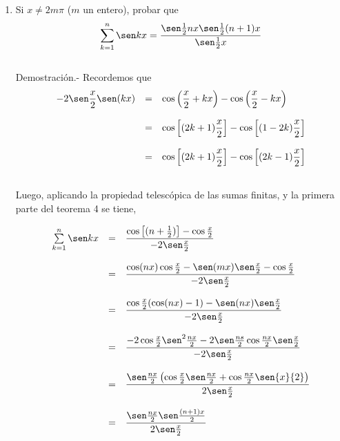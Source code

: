 \begin{enumerate}[\bfseries 1.]
\item Si $x\neq 2m\pi$ ($m$ un entero), probar que 
    $$\sum\limits_{k=1}^n \sen kx = \dfrac{\sen\frac{1}{2} nx \sen\frac{1}{2}(n+1)x}{\sen\frac{1}{2}x}$$\\
    Demostración.-\; Recordemos que 
    $$\begin{array}{rcl}
    -2\sen\dfrac{x}{2}\sen(kx)&=&\cos\left(\dfrac{x}{2}+kx\right) - \cos\left(\dfrac{x}{2}-kx\right)\\\\
			      &=&\cos\left[(2k+1)\dfrac{x}{2}\right]-\cos\left[(1-2k)\dfrac{x}{2}\right]\\\\
			      &=&\cos \left[(2k+1)\dfrac{x}{2}\right]-\cos\left[(2k-1)\dfrac{x}{2}\right]\\\\
    \end{array}$$
    
    Luego, aplicando la propiedad telescópica de las sumas finitas, y la primera parte del teorema 4 se tiene,

    $$\begin{array}{rcl}
	\sum\limits_{k=1}^n \sen kx&=&\dfrac{\cos \left[(n+\frac{1}{2})\right]-\cos \frac{x}{2}}{-2\sen \frac{x}{2}}\\\\
				   &=&\dfrac{\cos(nx)\cos \frac{x}{2}-\sen(mx)\sen \frac{x}{2}-\cos \frac{x}{2}}{-2\sen \frac{x}{2}}\\\\
				   &=&\dfrac{\cos\frac{x}{2}(\cos(nx)-1)-\sen (nx) \sen \frac{x}{2}}{-2\sen \frac{x}{2}}\\\\
				   &=&\dfrac{-2\cos \frac{x}{2}\sen^2 \frac{nx}{2} - 2\sen \frac{ns}{2} \cos \frac{nx}{2} \sen \frac{x}{2}}{-2\sen \frac{x}{2}}\\\\
				   &=&\dfrac{\sen \frac{nx}{2}\left(\cos \frac{x}{2} \sen \frac{nx}{2} + \cos \frac{nx}{2} \sen{x}{2}\right)}{2\sen \frac{x}{2}}\\\\
				   &=&\dfrac{\sen \frac{nx}{2} \sen \frac{(n+1)x}{2}}{2\sen \frac{x}{2}}\\\\
    \end{array}$$


\end{enumerate}

